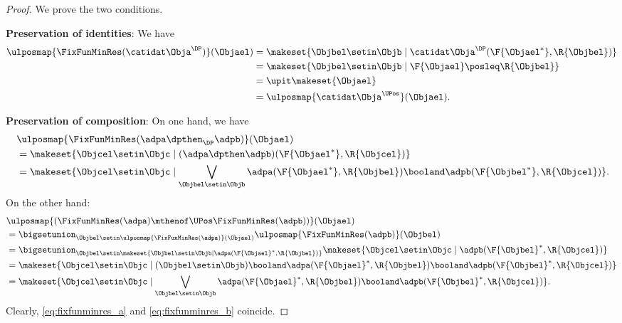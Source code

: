 \begin{proof}
    We prove the two conditions.

    \textbf{Preservation of identities}:
    We have
    \begin{equation}
        \begin{aligned}
            \ulposmap{\FixFunMinRes(\catidat\Obja^{\DP})}(\Objael) & =\makeset{ \Objbel\setin \Objb\mid \catidat\Obja^{\DP}(\F{\Objael^*},\R{\Objbel})} \\
                                                                   & =\makeset{ \Objbel \setin \Objb\mid \F{\Objael}\posleq\R{\Objbel}} \\
                                                                   & =\upit \makeset{ \Objael} \\
                                                                   & =\ulposmap{\catidat\Obja^{\UPos}}(\Objael).
        \end{aligned}
    \end{equation}

    \textbf{Preservation of composition}:
    On one hand, we have
    \begin{equation}
        \label{eq:fixfunminres_a}
        \begin{aligned}
            ~ & \ulposmap{\FixFunMinRes(\adpa\dpthen_\DP \adpb)}(\Objael) \\
              & =\makeset{ \Objcel\setin \Objc\mid (\adpa\dpthen \adpb)(\F{\Objael^*},\R{\Objcel})} \\
              & =\makeset{ \Objcel\setin \Objc\mid \bigvee_{\Objbel \setin \Objb}\adpa(\F{\Objael^*},\R{\Objbel})\booland \adpb(\F{\Objbel^*},\R{\Objcel})}.
        \end{aligned}
    \end{equation}
    On the other hand:
    \begin{equation}
        \label{eq:fixfunminres_b}
        \begin{aligned}
             & \ulposmap{(\FixFunMinRes(\adpa)\mthenof\UPos \FixFunMinRes(\adpb))}(\Objael) \\
             & =\bigsetunion_{\Objbel \setin \ulposmap{\FixFunMinRes(\adpa)}(\Objael)}\ulposmap{\FixFunMinRes(\adpb)}(\Objbel) \\
             & =\bigsetunion_{\Objbel \setin \makeset{ \Objbel \setin \Objb \mid \adpa(\F{\Objael}^*,\R{\Objbel})}} \makeset{\Objcel \setin \Objc \mid \adpb(\F{\Objbel}^*,\R{\Objcel})} \\
             & =\makeset{\Objcel\setin \Objc \mid (\Objbel \setin \Objb)\booland \adpa(\F{\Objael}^*,\R{\Objbel})\booland \adpb(\F{\Objbel}^*,\R{\Objcel})} \\
             & =\makeset{ \Objcel\setin \Objc\mid \bigvee_{\Objbel \setin \Objb}\adpa(\F{\Objael}^*,\R{\Objbel})\booland \adpb(\F{\Objbel}^*,\R{\Objcel})}.
        \end{aligned}
    \end{equation}
    Clearly, \cref{eq:fixfunminres_a} and \cref{eq:fixfunminres_b} coincide.
\end{proof}

